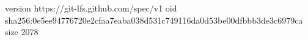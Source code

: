 version https://git-lfs.github.com/spec/v1
oid sha256:0e5ee94776720e2cfaa7eaba038d531c749116da0d53be00dfbbb3de3c6979ca
size 2078
